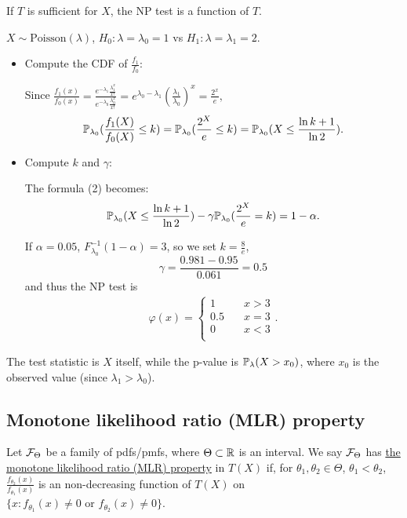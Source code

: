 \begin{prop}
	If $T$ is sufficient for $X$, the NP test is a function of $T$.
\end{prop} 

\begin{exap} 	$X \sim \mathrm{Poisson}(\lambda)$, $H_0: \lambda = \lambda_0 = 1$ vs $H_1: \lambda = \lambda_1 =2$. 
	
	\begin{itemize}
		\item Compute the CDF of $\frac{f_1}{f_0}$:
		
		Since $\frac{f_1(x)}{f_0(x)} = \frac{ e^{-\lambda_1}\frac{\lambda_1^x}{x!} }{ e^{-\lambda_0} \frac{\lambda_0^x}{x!} } = e^{\lambda_0 - \lambda_1} (\frac{\lambda_1}{\lambda_0})^x = \frac{2^x}{e},$
		$$\mathbb{P}_{\lambda_0} ( \frac{f_1(X)}{f_0(X)} \leq k ) = \mathbb{P}_{\lambda_0} ( \frac{2^X}{e} \leq k) = \mathbb{P}_{\lambda_0} (X \leq \frac{\ln k + 1}{\ln 2}).$$
		
		
		\item Compute $k$ and $\gamma$:
		
		The formula (2) becomes:
		$$\mathbb{P}_{\lambda_0} (X \leq \frac{\ln k + 1}{\ln 2}) - \gamma \mathbb{P}_{\lambda_0}( \frac{2^X}{e} = k ) = 1 -\alpha.$$
		
		If $\alpha = 0.05$, $F^{-1}_{\lambda_0}(1 - \alpha) = 3$, so we set $k = \frac{8}{e}$, 
		$$\gamma = \frac{0.981 - 0.95}{0.061} = 0.5$$
		and thus the NP test is 
		\begin{align*}
		\varphi(x) = \begin{cases}
		1 &\quad x>3 \\
		0.5 &\quad x=3 \\
		0 &\quad x<3 \\
		\end{cases}.
		\end{align*}
		
	\end{itemize} 
	
	The test statistic is $X$ itself, while the p-value is $\mathbb{P}_\lambda(X > x_0)$, where $x_0$ is the observed value (since $\lambda_1 > \lambda_0$).
\end{exap}

\subsection{Monotone likelihood ratio (MLR) property}
\begin{mydef}
	Let $\mathcal{F}_\Theta$ be a family of pdfs/pmfs, where $\Theta \subset \mathbb{R}$ is an interval. We say $\mathcal{F}_\Theta$ has \uline{the monotone likelihood ratio (MLR) property} in $T(X)$ if, for $\theta_1, \theta_2 \in \Theta$, $\theta_1 < \theta_2$, $\frac{f_{\theta_2} (x)}{f_{\theta_1} (x)}$ is an non-decreasing function of $T(X)$ on $\{ x: f_{\theta_1}(x) \neq 0 \text{ or } f_{\theta_2} (x) \neq 0 \}$. 
\end{mydef}

